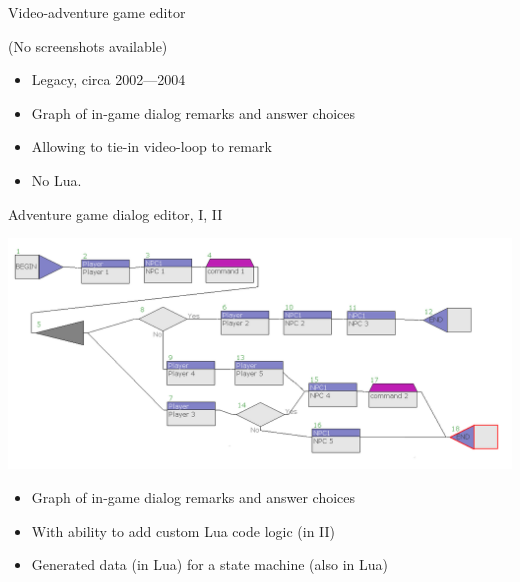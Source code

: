 \documentclass[handout]{beamer}
\begin{document}

\begin{frame}{Video-adventure game editor}

(No screenshots available)

\begin{itemize}
\item Legacy, circa 2002—2004
\item Graph of in-game dialog remarks and answer choices
\item Allowing to tie-in video-loop to remark
\item No Lua.
\end{itemize}

\end{frame}


\begin{frame}{Adventure game dialog editor, I, II}

\includegraphics[height=.4\textheight]{adventure}

\begin{itemize}
\item Graph of in-game dialog remarks and answer choices
\item With ability to add custom Lua code logic (in II)
\item Generated data (in Lua) for a state machine (also in Lua)
\end{itemize}

\end{frame}

\end{document}
